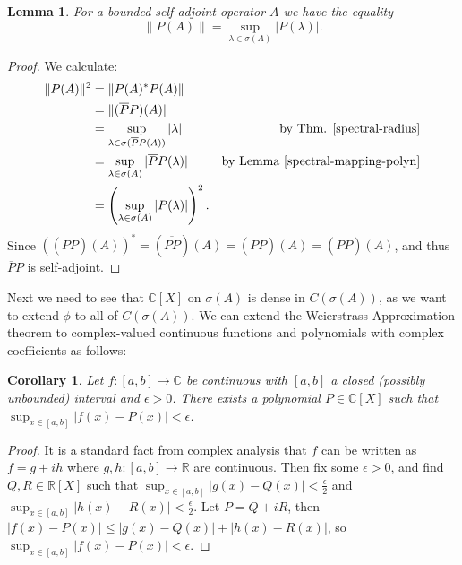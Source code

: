 \documentclass[12pt,oneside]{report}
\newtheorem{cor}[thm]{Corollary}
\newtheorem{lem}[thm]{Lemma}
\begin{document}

\begin{lem}
    For a bounded self-adjoint operator $A$ we have the equality $$\|P(A)\| = \sup_{\lambda \in \sigma(A)} |P(\lambda)|.$$
\end{lem}
\begin{proof}
    We calculate:
\begin{align*}
\|P(A)\|^{2} &= \|P(A)^{*}P(A)\| \\
&= \|(\overline{P}P)(A)\| \\
&= \sup_{\lambda \in \sigma(\overline{P}P(A))} |\lambda| & \text{by Thm. \ref{spectral-radius}} \\
&= \sup_{\lambda \in \sigma(A)} |\overline{P}P(\lambda)| & \text{by Lemma \ref{spectral-mapping-polyn}} \\
&= \left( \sup_{\lambda \in \sigma(A)} |P(\lambda)| \right)^{2}.
\end{align*}
Since $((\overline{P}P)(A))^{*} = (\overline{\overline{P}P})(A) = (P\overline{P})(A) = (\overline{P}P)(A)$, and thus $\overline{P}P$ is self-adjoint.
\end{proof}

Next we need to see that $\mathbb{C}[X]$ on $\sigma(A)$ is dense in $C(\sigma(A))$, as we want to extend $\phi$ to all of $C(\sigma(A))$. We can extend the Weierstrass Approximation theorem to complex-valued continuous functions and polynomials with complex coefficients as follows:

\begin{cor}
    Let $f: [a,b] \to \mathbb{\mathbb{C}}$ be continuous with $[a,b]$ a closed (possibly unbounded) interval and $\epsilon > 0$. There exists a polynomial $P \in \mathbb{\mathbb{C}}[X]$ such that $\sup_{x \in [a,b]}|f(x) - P(x)| < \epsilon$.
\end{cor}
\begin{proof}
    It is a standard fact from complex analysis that $f$ can be written as $f = g + ih$ where $g,h: [a,b] \to \mathbb{R}$ are continuous. Then fix some $\epsilon > 0$, and find $Q,R \in \mathbb{R}[X]$ such that $\sup_{x\in[a,b]} |g(x) - Q(x)| < \frac{\epsilon}{2}$ and $\sup_{x\in[a,b]} |h(x) - R(x)| < \frac{\epsilon}{2}$. Let $P = Q + iR$, then $|f(x) - P(x)| \leq |g(x) - Q(x)| + |h(x) - R(x)|$, so $\sup_{x\in[a,b]}|f(x) - P(x)| < \epsilon$.
\end{proof}
\end{document}
